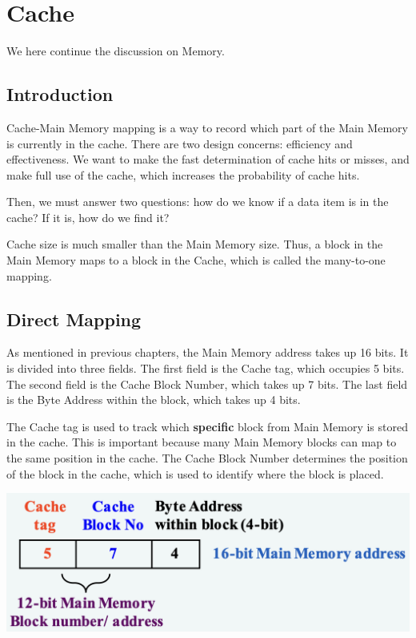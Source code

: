\chapter{Cache}

We here continue the discussion on Memory. 

\section{Introduction}
Cache-Main Memory mapping is a way to record which part of the Main Memory is currently in the cache. There are two design concerns: efficiency and effectiveness. We want to make the fast determination of cache hits or misses, and make full use of the cache, which increases the probability of cache hits.

Then, we must answer two questions: how do we know if a data item is in the cache? If it is, how do we find it?

Cache size is much smaller than the Main Memory size. Thus, a block in the Main Memory maps to a block in the Cache, which is called the many-to-one mapping.

\section{Direct Mapping}
As mentioned in previous chapters, the Main Memory address takes up 16 bits. It is divided into three fields. The first field is the Cache tag, which occupies 5 bits. The second field is the Cache Block Number, which takes up 7 bits. The last field is the Byte Address within the block, which takes up 4 bits.

\begin{minipage}{0.45\textwidth}
The Cache tag is used to track which \textbf{specific} block from Main Memory is stored in the cache. This is important because many Main Memory blocks can map to the same position in the cache. The Cache Block Number determines the position of the block in the cache, which is used to identify where the block is placed.
\end{minipage}\quad
\begin{minipage}{0.5\textwidth}
  \begin{center}
    \includegraphics[width=\textwidth]{Figure/direct_mapping.png}
  \end{center}
\end{minipage}

